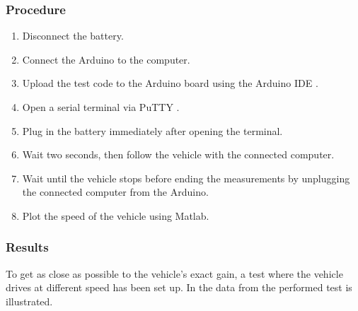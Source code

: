 \subsubsection{Procedure}

\begin{enumerate}
  \item Disconnect the battery.
  \item Connect the Arduino to the computer.
  \item Upload the test code to the Arduino board using the Arduino IDE  \cite{ArduinoIDE}.
  \item Open a serial terminal via PuTTY \cite{PuTTY}.
  \item Plug in the battery immediately after opening the terminal.
  \item Wait two seconds, then follow the vehicle with the connected computer.
  \item Wait until the vehicle stops before ending the measurements by unplugging the connected computer from the Arduino.
  \item Plot the speed of the vehicle using Matlab.
\end{enumerate}

\subsubsection{Results}
To get as close as possible to the vehicle's exact gain, a test where the vehicle drives at different speed has been set up. In  the data from the performed test is illustrated. 

